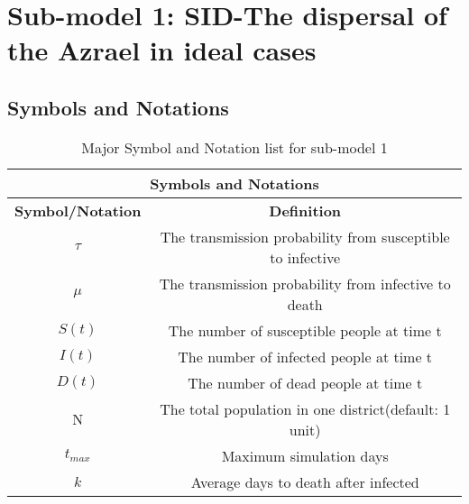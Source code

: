 \section{Sub-model 1: SID-The dispersal of the Azrael in ideal cases}
\subsection{Symbols and Notations}
\begin{table}[htbp]
\centering
\caption{Major Symbol and Notation list for sub-model 1}
\begin{tabular}{|c|c|c|c|c|c|c|}
\hline
                                      \multicolumn{ 7}{|c|}{{\bf Symbols and Notations}} \\
\hline
\multicolumn{ 2}{|c|}{{\bf Symbol/Notation}} &                  \multicolumn{ 5}{|c|}{{\bf Definition}} \\
\hline
\multicolumn{ 2}{|c|}{$\tau$} & \multicolumn{ 5}{|c|}{The transmission probability from susceptible to infective} \\
\hline
\multicolumn{ 2}{|c|}{$\mu$} & \multicolumn{ 5}{|c|}{The transmission probability from infective to death} \\
\hline
\multicolumn{ 2}{|c|}{$S(t)$} & \multicolumn{ 5}{|c|}{The number of susceptible people at time t} \\
\hline
\multicolumn{ 2}{|c|}{$I(t)$} & \multicolumn{ 5}{|c|}{The number of infected people at time t} \\
\hline
\multicolumn{ 2}{|c|}{$D(t)$} &     \multicolumn{ 5}{|c|}{The number of dead people at time t} \\
\hline
\multicolumn{ 2}{|c|}{N} & \multicolumn{ 5}{|c|}{The total population in one district(default: 1 unit)} \\
\hline
\multicolumn{ 2}{|c|}{$t_{max}$} &                 \multicolumn{ 5}{|c|}{Maximum simulation days} \\
\hline
\multicolumn{ 2}{|c|}{$k$} &    \multicolumn{ 5}{|c|}{Average days to death after infected} \\
\hline
\end{tabular}  

\end{table}
